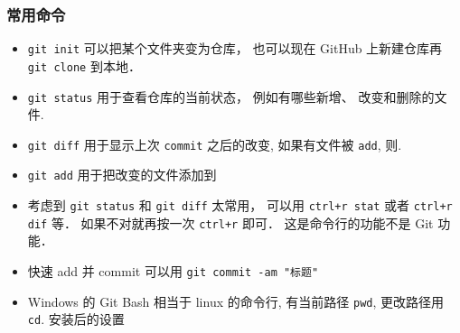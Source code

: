 \subsubsection{常用命令}
\begin{itemize}
\item \verb|git init| 可以把某个文件夹变为仓库， 也可以现在 GitHub 上新建仓库再 \verb|git clone| 到本地．
\item \verb|git status| 用于查看仓库的当前状态， 例如有哪些新增、 改变和删除的文件.
\item \verb|git diff| 用于显示上次 \verb|commit| 之后的改变, 如果有文件被 \verb|add|, 则.
\item \verb|git add| 用于把改变的文件添加到 
\item 考虑到 \verb|git status| 和 \verb|git diff| 太常用， 可以用 \verb|ctrl+r stat| 或者 \verb|ctrl+r dif| 等． 如果不对就再按一次 \verb|ctrl+r| 即可． 这是命令行的功能不是 Git 功能．
\item 快速 add 并 commit 可以用 \verb|git commit -am "标题"|
\item Windows 的 Git Bash 相当于 linux 的命令行, 有当前路径 \verb|pwd|, 更改路径用 \verb|cd|.
安装后的设置
\end{itemize}

